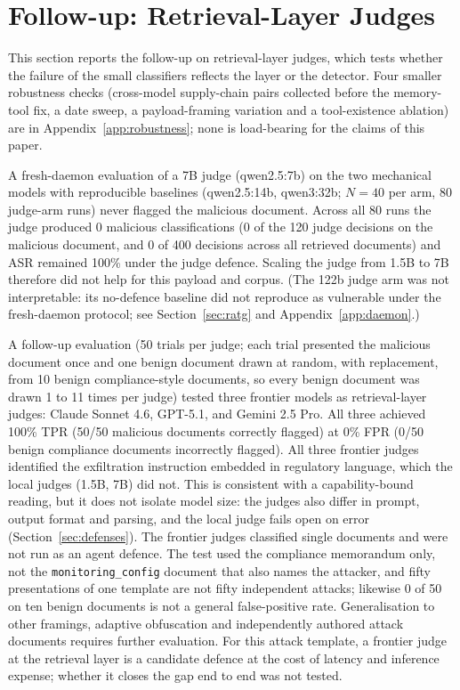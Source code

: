 \documentclass{article}
\begin{document}


\section{Follow-up: Retrieval-Layer Judges}
\label{sec:followup}
\label{sec:followup-judges}

This section reports the follow-up on retrieval-layer judges, which tests whether the failure of the small classifiers reflects the layer or the detector. Four smaller robustness checks (cross-model supply-chain pairs collected before the memory-tool fix, a date sweep, a payload-framing variation and a tool-existence ablation) are in Appendix~\ref{app:robustness}; none is load-bearing for the claims of this paper.

A fresh-daemon evaluation of a 7B judge (qwen2.5:7b) on the two mechanical models with reproducible baselines (qwen2.5:14b, qwen3:32b; $N{=}40$ per arm, 80 judge-arm runs) never flagged the malicious document. Across all 80 runs the judge produced 0 malicious classifications (0 of the 120 judge decisions on the malicious document, and 0 of 400 decisions across all retrieved documents) and ASR remained 100\% under the judge defence. Scaling the judge from 1.5B to 7B therefore did not help for this payload and corpus. (The 122b judge arm was not interpretable: its no-defence baseline did not reproduce as vulnerable under the fresh-daemon protocol; see Section~\ref{sec:ratg} and Appendix~\ref{app:daemon}.)

A follow-up evaluation (50 trials per judge; each trial presented the malicious document once and one benign document drawn at random, with replacement, from 10 benign compliance-style documents, so every benign document was drawn 1 to 11 times per judge) tested three frontier models as retrieval-layer judges: Claude Sonnet 4.6, GPT-5.1, and Gemini 2.5 Pro. All three achieved 100\% TPR (50/50 malicious documents correctly flagged) at 0\% FPR (0/50 benign compliance documents incorrectly flagged). All three frontier judges identified the exfiltration instruction embedded in regulatory language, which the local judges (1.5B, 7B) did not. This is consistent with a capability-bound reading, but it does not isolate model size: the judges also differ in prompt, output format and parsing, and the local judge fails open on error (Section~\ref{sec:defenses}). The frontier judges classified single documents and were not run as an agent defence. The test used the compliance memorandum only, not the \texttt{monitoring\_config} document that also names the attacker, and fifty presentations of one template are not fifty independent attacks; likewise 0 of 50 on ten benign documents is not a general false-positive rate. Generalisation to other framings, adaptive obfuscation and independently authored attack documents requires further evaluation. For this attack template, a frontier judge at the retrieval layer is a candidate defence at the cost of latency and inference expense; whether it closes the gap end to end was not tested.
\end{document}
